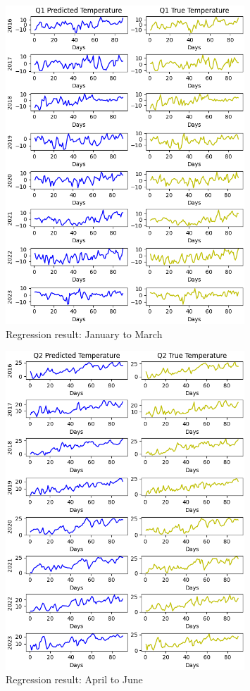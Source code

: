 \documentclass[12pt]{article}
\begin{document}
\begin{figure}[htpb]
	\centering
	\includegraphics[width=0.8\textwidth]{pic/Predicted-and-Tested-InSeq_1.png}
	\caption{Regression result: January to March}
	\label{Fig:pred-1}
\end{figure}

\begin{figure}[htpb]
	\centering
	\includegraphics[width=0.8\textwidth]{pic/Predicted-and-Tested-InSeq_2.png}
	\caption{Regression result: April to June}
	\label{Fig:pred-2}
\end{figure}
\end{document}
